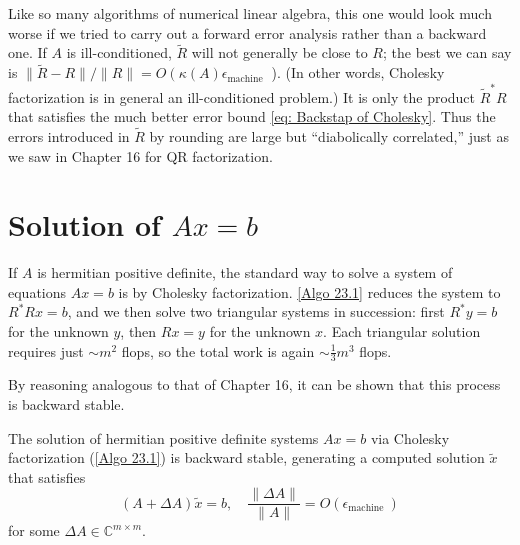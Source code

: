 \begin{note}
    Like so many algorithms of numerical linear algebra, this one would look much worse if we tried to carry out a forward error analysis rather than a backward one. If $A$ is ill-conditioned, $\tilde{R}$ will not generally be close to $R$; the best we can say is $\|\tilde{R}-R\| /\|R\|=O\left(\kappa(A) \epsilon_{\text {machine }}\right.$ ). (In other words, Cholesky factorization is in general an ill-conditioned problem.) It is only the product $\tilde{R}^* R$ that satisfies the much better error bound \eqref{eq: Backstap of Cholesky}. Thus the errors introduced in $\tilde{R}$ by rounding are large but ``diabolically correlated,'' just as we saw in Chapter 16 for QR factorization.
\end{note}

\section{Solution of $Ax=b$}
If $A$ is hermitian positive definite, the standard way to solve a system of equations $A x=b$ is by Cholesky factorization. \autoref{Algo 23.1} reduces the system to $R^* R x=b$, and we then solve two triangular systems in succession: first $R^* y=b$ for the unknown $y$, then $R x=y$ for the unknown $x$. Each triangular solution requires just $\sim m^2$ flops, so the total work is again $\sim \frac{1}{3} m^3$ flops.

By reasoning analogous to that of Chapter 16, it can be shown that this process is backward stable.


\begin{theorem}
\label{thm: Backstap of Cholesky on LS}
The solution of hermitian positive definite systems $A x=b$ via Cholesky factorization (\autoref{Algo 23.1}) is backward stable, generating a computed solution $\tilde{x}$ that satisfies
$$
(A+\Delta A) \tilde{x}=b, \quad \frac{\|\Delta A\|}{\|A\|}=O\left(\epsilon_{\text {machine }}\right)
$$
for some $\Delta A \in \mathbb{C}^{m \times m}$. 
\end{theorem}
